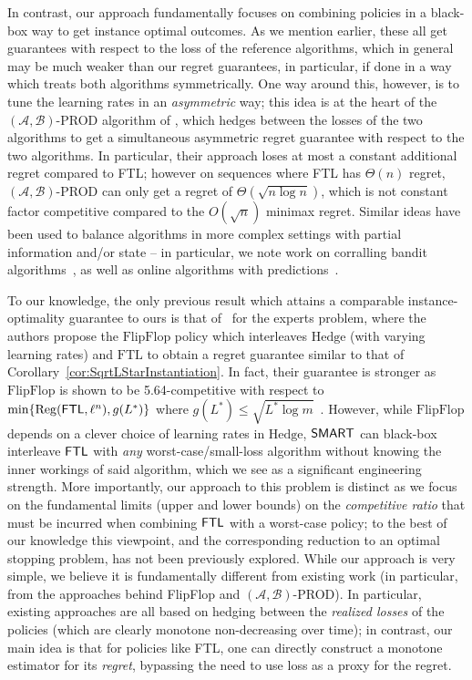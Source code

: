 In contrast, our approach fundamentally focuses on combining policies in a black-box way to get instance optimal outcomes. 
As we mention earlier, these all get guarantees with respect to the loss of the reference algorithms, which in general may be much weaker than our regret guarantees, in particular, if done in a way which treats both algorithms symmetrically. One way around this, however, is to tune the learning rates in an \emph{asymmetric} way; this idea is at the heart of the $(\mathcal{A},\mathcal{B})$-PROD algorithm of \cite{sani2014exploiting}, which hedges between the losses of the two algorithms to get a simultaneous  asymmetric
regret guarantee with respect to the two algorithms. In particular, their approach loses at most a constant additional regret compared to FTL; however on sequences where FTL has $\Theta(n)$ regret, $(\mathcal{A},\mathcal{B})$-PROD can only get a regret of $\Theta(\sqrt{n \log n})$, which is not constant factor competitive compared to the $O(\sqrt{n})$ minimax regret.
Similar ideas have been used to balance algorithms in more complex settings with partial information and/or state -- in particular, we note work on corralling bandit algorithms~\citep{agarwal2017corralling,pacchiano2020model,Dann--Wei--Zimmert2023}, as well as online algorithms with predictions~\citep{bamas2020primal,dinitz2022algorithms,anand2022online}.

To our knowledge, the only previous result which attains a comparable instance-optimality guarantee to ours is that of~\cite{de2014follow} for the experts problem, where the authors propose the $\text{FlipFlop}$ policy which interleaves $\text{Hedge}$ (with varying learning rates) and $\text{FTL}$ to obtain a regret guarantee similar to that of Corollary~\ref{cor:SqrtLStarInstantiation}. In fact, their guarantee is stronger as $\text{FlipFlop}$ is shown to be 5.64-competitive with respect to $\min\{\mathrm{Reg}(\mathsf{FTL},\ell^n), g(L^*)\}$ where $g(L^*) \le \sqrt{L^* \log m}$~\citep[Corollary 16]{de2014follow}. However, 
while $\text{FlipFlop}$ depends on a clever choice of learning rates in $\text{Hedge}$, $\mathsf{SMART}$ can black-box interleave $\mathsf{FTL}$ with \emph{any} worst-case/small-loss algorithm without knowing the inner workings of said algorithm, which we see as a significant engineering strength. More importantly, our approach to this problem is distinct as we focus on the fundamental limits (upper and lower bounds) on the \emph{competitive ratio} that must be incurred when combining $\mathsf{FTL}$ with a worst-case policy; to the best of our knowledge this viewpoint, and the corresponding reduction to an optimal stopping problem, has not been previously explored. While our approach is very simple, we believe it is fundamentally different from existing work (in particular, from the approaches behind FlipFlop and $(\mathcal{A},\mathcal{B})$-PROD). In particular, existing approaches are all based on hedging between the \emph{realized losses} of the policies (which are clearly monotone non-decreasing over time); in contrast, our main idea is that for policies like FTL, one can directly construct a monotone estimator for its \emph{regret}, bypassing the need to use loss as a proxy for the regret.
